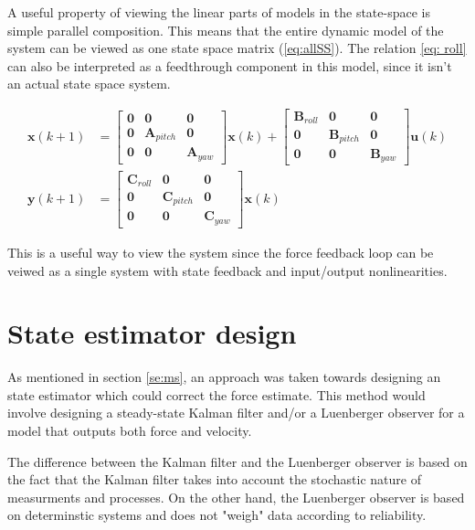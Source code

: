 A  useful property of viewing the linear parts of models in the state-space is simple parallel composition.
This means that the entire dynamic model of the system can be viewed as one state space matrix (\ref{eq:allSS}).
The relation \ref{eq: roll} can also be interpreted as a feedthrough component in this model, since it isn't an actual state space system.

\begin{align}\label{eq:allSS}
\mathbf{x}(k+1) &= 
\begin{bmatrix} \mathbf{0} & \mathbf{0} & \mathbf{0}\\
 \mathbf{0} & \mathbf{A}_{pitch} &\mathbf{0}\\
 \mathbf{0} &\mathbf{0} & \mathbf{A}_{yaw}  \end{bmatrix} 
 \mathbf{x}(k) + 
\begin{bmatrix} \mathbf{B}_{roll} & \mathbf{0} & \mathbf{0}\\
 \mathbf{0} & \mathbf{B}_{pitch} &\mathbf{0}\\
 \mathbf{0} &\mathbf{0} & \mathbf{B}_{yaw}  \end{bmatrix} 
 \mathbf{u}(k)\\
\mathbf{y}(k+1) &= 
\begin{bmatrix} \mathbf{C}_{roll} & \mathbf{0} & \mathbf{0}\\
 \mathbf{0} & \mathbf{C}_{pitch} &\mathbf{0}\\
 \mathbf{0} &\mathbf{0} & \mathbf{C}_{yaw}  \end{bmatrix} 
\mathbf{x}(k) 
\end{align}

This is a useful way to view the system since the force feedback loop can be veiwed as a single system with state feedback and input/output nonlinearities.

\section{State estimator design}
As mentioned in section \ref{se:ms}, an approach was taken towards designing an state estimator which could correct the force estimate.
This method would involve designing a steady-state Kalman filter \cite{brown1997introduction} and/or a Luenberger observer  \cite{friedland2012control} for a model that outputs both force and velocity.

The difference between the Kalman filter and the Luenberger observer is based on the fact that the Kalman filter takes into account the stochastic nature of measurments and processes. On the other hand, the Luenberger observer is based on determinstic systems and does not "weigh" data according to reliability.

